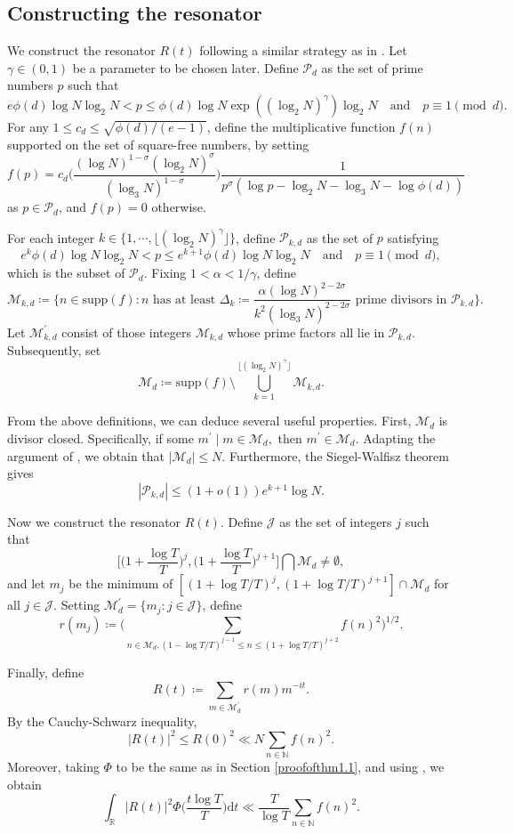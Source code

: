 \documentclass[12pt,reqno]{amsart}
\theoremstyle{definition}
\numberwithin{equation}{section}
\newcommand{\mbr}{\mathbb{R}}
\newcommand{\mbn}{\mathbb{N}}
\newcommand{\mcj}{\mathcal{J}}
\newcommand{\mcp}{\mathcal{P}}
\newcommand{\mcm}{\mathcal{M}}
\begin{document}
\subsection{Constructing the resonator}
\label{resonator2}
We construct the resonator $R(t)$ following a similar strategy as in \cite{chirre2019extreme}. Let $\gamma \in (0,1)$ be a parameter to be chosen later. Define $\mcp_d$ as the set of prime numbers $p$ such that
$$
e \phi(d) \log N \log_{2}N < p \le \phi(d)\log N\exp((\log_2 N)^{\gamma})\log_{2}N \quad \text{and} \quad p\equiv 1 \pmod{d}.
$$
For any $1 \le c_d \le \sqrt{\phi(d)/(e-1)}$, define the multiplicative function $f(n)$ supported on the set of square-free numbers, by setting
$$
f(p) = c_d \bigg( \frac{(\log N)^{1 - \sigma} (\log_2 N)^{\sigma}}{(\log_3 N)^{1 - \sigma}} \bigg) \frac{1}{p^{\sigma} (\log p - \log_2 N - \log_3 N - \log \phi(d))}
$$
as $p \in \mcp_d$, and $f(p) = 0$ otherwise.
\par
For each integer $k \in \{1, \cdots, \lfloor(\log_2 N)^{\gamma}\rfloor\}$, define $\mcp_{k,d}$ as the set of $p$ satisfying
$$
e^k \phi(d) \log N \log_{2}N < p \le e^{k+1}\phi(d)\log N\log_{2}N \quad \text{and} \quad p\equiv 1 \pmod{d},
$$
which is the subset of $\mcp_d$. Fixing $1 < \alpha < 1/\gamma$, define 
$$
\mcm_{k,d} \coloneqq \bigg\{ n \in \mathrm{supp}(f) : n \text{ has at least } \Delta_k \coloneqq \frac{\alpha (\log N)^{2 - 2\sigma}}{k^2 (\log_3 N)^{2 - 2\sigma}} \text{ prime divisors in } \mathcal{P}_{k,d} \bigg\}.
$$ 
Let $\mcm^{\prime}_{k,d}$ consist of those integers $\mcm_{k,d}$ whose  prime factors all lie in $\mcp_{k,d}$. Subsequently, set
$$
\mcm_d \coloneqq \mathrm{supp}(f) \setminus \bigcup_{k = 1}^{\lfloor(\log_2 N)^{\gamma}\rfloor} \mcm_{k,d}. 
$$
\par
From the above definitions, we can deduce several useful properties. First, $\mcm_d$ is divisor closed. Specifically, if some $m^{\prime} \mid m \in \mcm_d,$ then $m^{\prime} \in \mcm_d$. Adapting the argument of \cite[Lemma 8]{chirre2019extreme}, we obtain that $|\mcm_d| \le N$. Furthermore, the Siegel-Walfisz theorem gives
\begin{equation}
\label{Pkdcardinality}
  |\mcp_{k,d}| \le (1 + o(1)) e^{k+1} \log N.  
\end{equation}
\par
Now we construct the resonator $R(t)$. Define $\mcj$ as the set of integers $j$ such that
$$
\bigg[\Big(1 + \frac{\log T}{T}\Big)^j, \Big(1 + \frac{\log T}{T}\Big)^{j + 1}\bigg] \bigcap \mcm_d \neq \emptyset,
$$ 
and let $m_j$ be the minimum of $[(1 + \log T/T)^j, (1 + \log T/T)^{j + 1}] \cap \mcm_d $ for all $j \in \mcj.$ Setting $\mcm^{\prime}_d = \{m_j : j \in \mcj \}$, define
$$
r(m_j) \coloneqq \bigg( \sum_{n \in \mcm_d, (1 - \log T/T)^{j - 1} \le n \le (1 + \log T/T)^{j + 2}} f(n)^2 \bigg)^{1/2}.
$$
\par
Finally, define 
$$
R(t) \coloneqq \sum_{m \in \mcm^{\prime}_d} r(m) m^{-it}.
$$
By the Cauchy-Schwarz inequality,
$$
|R(t)|^2 \le R(0)^2 \ll N \sum_{n \in \mbn} f(n)^2.
$$
Moreover, taking $\Phi$ to be the same as in Section \ref{proofofthm1.1}, and using \cite[Lemma 5]{bondarenko2018argument}, we obtain
$$
\int_\mbr |R(t)|^{2}\Phi\Big(\frac{t\log T}{T}\Big)\mathrm{d}t \ll \frac{T}{\log T}\sum_{n \in \mbn} f(n)^2.
$$
\end{document}

